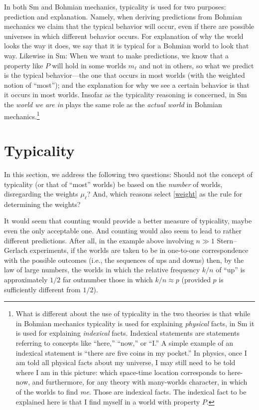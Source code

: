 \documentclass[12pt]{article}
\newcommand{\num}{n}
\begin{document}
In both Sm and Bohmian mechanics, typicality is used for two purposes: prediction and explanation. Namely, when deriving predictions from Bohmian mechanics we claim that the typical behavior will occur, even if there are possible universes in which different behavior occurs. For explanation of why the world looks the way it does, we say that it is typical for a Bohmian world to look that way. Likewise in Sm: When we want to make predictions, we know that a property like $P$ will hold in some worlds $m_\ell$ and not in others, so what we predict is the typical behavior---the one that occurs in most worlds (with the weighted notion of ``most''); and the explanation for why we see a certain behavior is that it occurs in most worlds. Insofar as the typicality reasoning is concerned, in Sm the \emph{world we are in} plays the same role as the \emph{actual world} in Bohmian mechanics.\footnote{What is different about the use of typicality in the two theories is that while in Bohmian mechanics typicality is used for explaining \emph{physical} facts, in Sm it is used for explaining \emph{indexical} facts. Indexical statements are statements referring to concepts like ``here,'' ``now,'' or ``I.'' A simple example of an indexical statement is ``there are five coins in my pocket.'' In physics, once I am told all physical facts about my universe, I may still need to be told where I am in this picture: which space-time location corresponds to here-now, and furthermore, for any theory with many-worlds character, in which of the worlds to find \emph{me}. Those are indexical facts. The indexical fact to be explained here is that I find myself in a world with property $P$.} 


\section{Typicality}
\label{sec:typicality}

In this section, we address the following two questions: Should not the concept of typicality (or that of ``most'' worlds) be based on the \emph{number} of worlds, disregarding the weights $\mu_\ell$? And, which reasons select \eqref{weight} as the rule for determining the weights?

It would seem that counting would provide a better measure of typicality, maybe even the only acceptable one. And counting would also seem to lead to rather different predictions. After all, in the example above involving $\num\gg 1$ Stern--Gerlach experiments, if the worlds are taken to be in one-to-one correspondence with the possible outcomes (i.e., the sequences of ups and downs) then, by the law of large numbers, the worlds in which the relative frequency $k/\num$ of ``up'' is approximately $1/2$ far outnumber those in which $k/\num\approx p$ (provided $p$ is sufficiently different from $1/2$).
\end{document}
